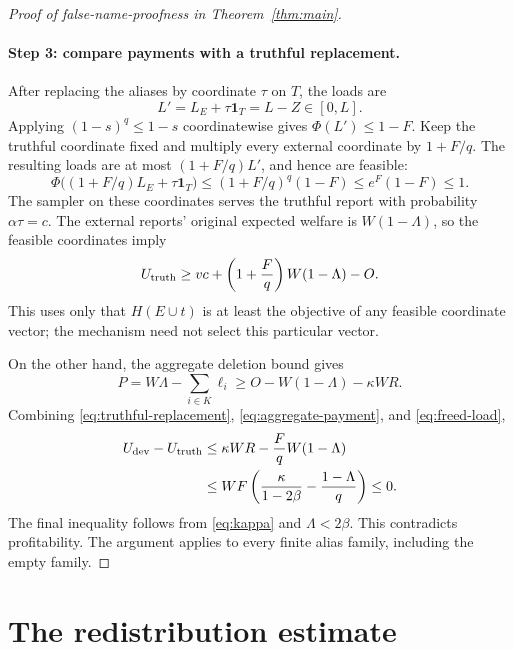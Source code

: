 \documentclass[11pt]{article}
\begin{document}
\begin{proof}[Proof of false-name-proofness in
Theorem~\ref{thm:main}]
\paragraph{Step 3: compare payments with a truthful replacement.}
After replacing the aliases by coordinate $\tau$ on $T$,
the loads are
\[
L'=L_E+\tau\mathbf{1}_T=L-Z\in[0,L].
\]
Applying $(1-s)^q\le1-s$ coordinatewise gives
$\Phi(L')\le1-F$.
Keep the truthful coordinate fixed and multiply every external
coordinate by $1+F/q$.
The resulting loads are at most $(1+F/q)L'$, and hence are feasible:
\[
\Phi\bigl((1+F/q)L_E+\tau\mathbf{1}_T\bigr)
\le(1+F/q)^q(1-F)
\le e^F(1-F)
\le1.
\]
The sampler on these coordinates serves the truthful report with
probability $\alpha\tau=c$.
The external reports' original expected welfare is
$W(1-\Lambda)$, so the feasible coordinates imply
\begin{equation}
\label{eq:truthful-replacement}
U_{\rm truth}
\ge
vc+\left(1+\frac Fq\right)W(1-\Lambda)-O.
\end{equation}
This uses only that $H(E\cup t)$ is at least the objective of
any feasible coordinate vector; the mechanism need not select
this particular vector.

On the other hand, the aggregate deletion bound gives
\begin{equation}
\label{eq:aggregate-payment}
P
=W\Lambda-\sum_{i\in K}\ell_i
\ge O-W(1-\Lambda)-\kappa WR.
\end{equation}
Combining \eqref{eq:truthful-replacement},
\eqref{eq:aggregate-payment}, and \eqref{eq:freed-load},
\begin{align*}
U_{\rm dev}-U_{\rm truth}
&\le
\kappa WR-\frac FqW(1-\Lambda)\\
&\le
WF\left(
\frac{\kappa}{1-2\beta}-\frac{1-\Lambda}{q}
\right)
\le0.
\end{align*}
The final inequality follows from \eqref{eq:kappa} and
$\Lambda<2\beta$.
This contradicts profitability.
The argument applies to every finite alias family, including
the empty family.
\end{proof}


\section{The redistribution estimate}
\label{sec:redistribution}
\end{document}

